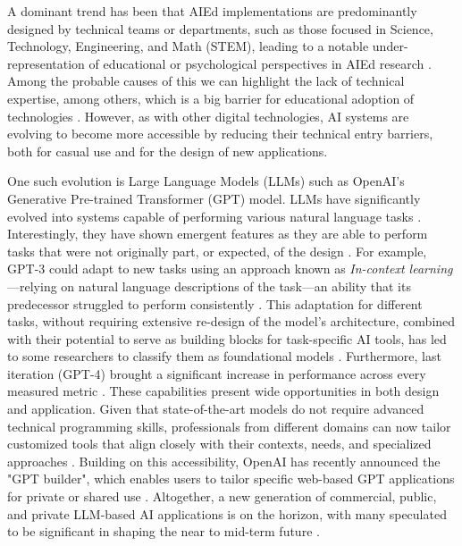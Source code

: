 \documentclass[sn-mathphys, Numbered]{sn-jnl}%
\theoremstyle{thmstyleone}%
\theoremstyle{thmstyletwo}%
\theoremstyle{thmstylethree}%
\begin{document}
A dominant trend has been that AIEd implementations are predominantly designed by technical teams or departments, such as those focused in Science, Technology, Engineering, and Math (STEM), leading to a notable under-representation of educational or psychological perspectives in AIEd research \parencite{holmes_state_2022, zawacki-richter_systematic_2019}. Among the probable causes of this we can highlight the lack of technical expertise, among others, which is a big barrier for educational adoption of technologies \parencite{reid_categories_2014}. However, as with other digital technologies, AI systems are evolving to become more accessible by reducing their technical entry barriers, both for casual use and for the design of new applications.

One such evolution is Large Language Models (LLMs) such as OpenAI's Generative Pre-trained Transformer (GPT) model. LLMs have significantly evolved into systems capable of performing various natural language tasks \parencite{brown_language_2020}. Interestingly, they have shown emergent features as they are able to perform tasks that were not originally part, or expected, of the design \parencite{wei_emergent_2022}. For example, GPT-3 could adapt to new tasks using an approach known as \textit{In-context learning}---relying on natural language descriptions of the task---an ability that its predecessor struggled to perform consistently \parencite{brown_language_2020, wei_emergent_2022}. This adaptation for different tasks, without requiring extensive re-design of the model's architecture, combined with their potential to serve as building blocks for task-specific AI tools, has led to some researchers to classify them as foundational models \parencite{eloundou_gpts_2023, bommasani_opportunities_2022}.  Furthermore, last iteration (GPT-4) brought a significant increase in performance across every measured metric \parencite{openai2023gpt4}.
These capabilities present wide opportunities in both design and application. Given that state-of-the-art models do not require advanced technical programming skills, professionals from different domains can now tailor customized tools that align closely with their contexts, needs, and specialized approaches \parencite{cain_gpteammate_2023}. Building on this accessibility, OpenAI has recently announced the "GPT builder", which enables users to tailor specific web-based GPT applications for private or shared use \parencite{openaidevshowcase, openai_introducing_2023}. Altogether, a new generation of commercial, public, and private LLM-based AI applications is on the horizon, with many speculated to be significant in shaping the near to mid-term future \parencite{bommasani_opportunities_2022, bubeck_sparks_2023}. 
\end{document}
